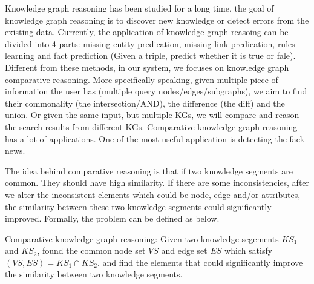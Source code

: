 


Knowledge graph reasoning has been studied for a long time, the goal of knowledge graph reasoning is to discover new knowledge or detect errors from the existing data. Currently, the application of knowledge graph reasoing can be divided into 4 parts: missing entity predication, missing link predication, rules learning and fact prediction (Given a triple, predict whether it is true or fale). Different from these methods, in our system, we focuses on knowledge graph comparative reasoning. More specifically speaking, given multiple piece of information the user has (multiple query nodes/edges/subgraphs), we aim to find their commonality (the intersection/AND), the difference (the diff) and the union. Or given the same input, but multiple KGs, we will compare and reason the search results from different KGs. Comparative knowledge graph reasoning has a lot of applications. One of the most useful application is detecting the fack news.

The idea behind comparative reasoning is that if two knowledge segments are common. They should have high similarity. If there are some inconsistencies, after we alter the inconsistent elements which could be node, edge and/or attributes, the similarity between these two knowledge segments could significantly improved.
Formally, the problem can be defined as below.
\begin{definition}{Comparative knowledge graph reasoning:}
Given two knowledge segements $KS_1$ and $KS_2$, found the common node set $VS$ and edge set $ES$ which satisfy $(VS, ES) = KS_1 \cap KS_2$. and find the elements that could significantly improve the similarity between two knowledge segments.
\end{definition}














